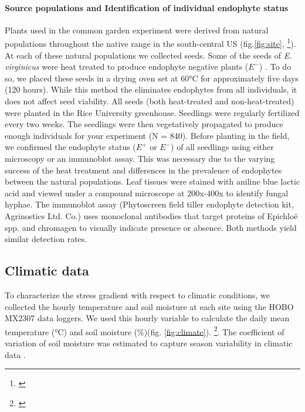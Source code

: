 \documentclass[11pt]{article}
\newcommand{\jacob}[2]{{\color{blue}{#1}}\footnote{\textit{\color{blue}{#2}}}}
\begin{document}
\paragraph {Source populations and Identification of individual endophyte status} 
Plants used  in the common garden experiment were derived from natural populations throughout the native range in the south-central US (fig.\ref{fig:site}, \jacob{Table X}{We need this table  in the Appendix}). 
At each of these natural populations we collected seeds. 
Some of the seeds of \emph{E. virginicus} were heat treated to produce endophyte negative plants ($E^-$) . 
To do so, we placed these seeds  in a drying oven set at 60°C for approximately five days (120 hours). 
While this method  the eliminates endophytes from all individuals, it does not affect seed viability. 
All seeds (both heat-treated and non-heat-treated) were planted in the Rice University greenhouse.
Seedlings were regularly fertilized every two weeks. 
The seedlings were then vegetatively propagated to produce enough individuals for your experiment (N = 840).
Before planting in the field, we confirmed the endophyte status ($E^+$ or $E^-$) of all  seedlings using either microscopy or an immunoblot assay. 
This was necessary due to the varying success of the heat treatment and differences in the prevalence of endophytes between the natural populations. 
Leaf tissues were stained with aniline blue lactic acid and viewed under a compound microscope at 200x-400x to identify fungal hyphae. 
The immunoblot assay (Phytoscreen field tiller endophyte detection kit, Agrinostics Ltd. Co.) uses monoclonal antibodies that target proteins of Epichloë spp. and chromagen to visually indicate presence or absence. Both methods yield similar detection rates.  

\subsection*{Climatic data}
To characterize the stress gradient with respect to  climatic conditions, we collected the hourly temperature and soil moisture at each site using the HOBO MX2307 data loggers. We used this hourly variable to calculate the daily mean temperature (°C) and soil moisture (\%)(fig. \ref{fig:climate}). 
\jacob{We calculated the mean soil moisture and the coefficient of variation from the time the plants were placed on the ground to the time we collected demographic data}{I will change this  later}. 
The coefficient of variation of soil moisture was estimated to capture season variability in climatic data \citep{medvigy2012trends,meshram2017long}. 
\end{document}
